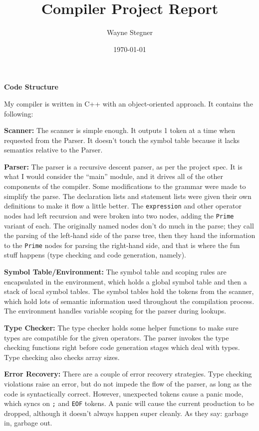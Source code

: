 \documentclass[letterpaper, 12pt, titlepage]{article}
\title{Compiler Project Report}
\author{
  Wayne Stegner
}
\date{
  \today
}
\begin{document}
  \maketitle
  \par \textbf{Code Structure}
  \par My compiler is written in C++ with an object-oriented approach.
  It contains the following:

  \par \textbf{Scanner:} The scanner is simple enough.
  It outputs 1 token at a time when requested from the Parser.
  It doesn't touch the symbol table because it lacks semantics relative to
  the Parser.

  \par \textbf{Parser:}
  The parser is a recursive descent parser, as per the project spec.
  It is what I would consider the ``main'' module, and it drives all of the
  other components of the compiler.
  Some modifications to the grammar were made to simplify the parse.
  The declaration lists and statement lists were given their own definitions
  to make it flow a little better.
  The \texttt{expression} and other operator nodes had left recursion and were
  broken into two nodes, adding the \texttt{Prime} variant of each.
  The originally named nodes don't do much in the parse; they call the parsing
  of the left-hand side of the parse tree, then they hand the information to
  the \texttt{Prime} nodes for parsing the right-hand side, and that is where
  the fun stuff happens (type checking and code generation, namely).

  \par \textbf{Symbol Table/Environment:}
  The symbol table and scoping rules are encapsulated in the environment, which
  holds a global symbol table and then a stack of local symbol tables.
  The symbol tables hold the tokens from the scanner, which hold lots of
  semantic information used throughout the compilation process.
  The environment handles variable scoping for the parser during lookups.

  \par \textbf{Type Checker:}
  The type checker holds some helper functions to make sure types are
  compatible for the given operators.
  The parser invokes the type checking functions right before code generation
  stages which deal with types.
  Type checking also checks array sizes.

  \par \textbf{Error Recovery:}
  There are a couple of error recovery strategies.
  Type checking violations raise an error, but do not impede the flow of the
  parser, as long as the code is syntactically correct.
  However, unexpected tokens cause a panic mode, which syncs on \texttt{;} and
  \texttt{EOF} tokens.
  A panic will cause the current production to be dropped, although it doesn't
  always happen super cleanly.
  As they say: garbage in, garbage out.
\end{document}

